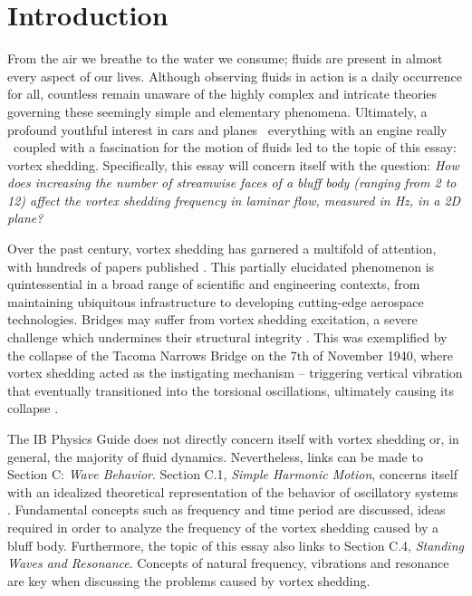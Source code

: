 \section{Introduction}
From the air we breathe to the water we consume; fluids are present in almost every aspect of our lives. Although observing fluids in action is a daily occurrence for all, countless remain unaware of the highly complex and intricate theories governing these seemingly simple and elementary phenomena. Ultimately, a profound youthful interest in cars and planes \textemdash\ everything with an engine really \textemdash\ coupled with a fascination for the motion of fluids led to the topic of this essay: vortex shedding. Specifically, this essay will concern itself with the question: \textit{How does increasing the number of streamwise faces of a bluff body (ranging from 2 to 12) affect the vortex shedding frequency in laminar flow, measured in Hz, in a 2D plane?}

Over the past century, vortex shedding has garnered a multifold of attention, with hundreds of papers published \parencite[61]{buresti1998}. This partially elucidated phenomenon is quintessential in a broad range of scientific and engineering contexts, from maintaining ubiquitous infrastructure to developing cutting-edge aerospace technologies. Bridges may suffer from vortex shedding excitation, a severe challenge which undermines their structural integrity \parencite[1040]{jurado2012}. This was exemplified by the collapse of the Tacoma Narrows Bridge on the 7th of November 1940, where vortex shedding acted as the instigating mechanism -- triggering vertical vibration that eventually transitioned into the torsional oscillations, ultimately causing its collapse \parencite{tacoma_bridge_vibrations}.

The IB Physics Guide \parencite{ib_physics_2025} does not directly concern itself with vortex shedding or, in general, the majority of fluid dynamics. Nevertheless, links can be made to Section C: \textit{Wave Behavior}. Section C.1, \textit{Simple Harmonic Motion}, concerns itself with an idealized theoretical representation of the behavior of oscillatory systems \parencite[313]{allum2023}. Fundamental concepts such as frequency and time period are discussed, ideas required in order to analyze the frequency of the vortex shedding caused by a bluff body. Furthermore, the topic of this essay also links to Section C.4, \textit{Standing Waves and Resonance}. Concepts of natural frequency, vibrations and resonance are key when discussing the problems caused by vortex shedding.





